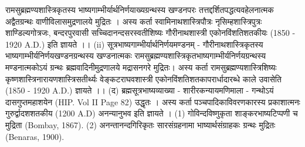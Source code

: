 रामसुब्रह्मण्यशास्त्रिकृतस्य भाष्यगाम्भीर्यार्थनिर्णयाख्यग्रन्थस्य खण्डनपरः तत्तद्दर्शितपद्धत्यवहेलनात्मक अद्वैतग्रन्थः वाणीविलासमुद्रणालये मुद्रितः । अस्य कर्ता स्वामिनाथशास्त्रिपौत्रः नृसिम्हशास्त्रिपुत्रः शाण्डिल्यगोत्रजः, बन्दरपुरवासी सच्चिदानन्दसरस्वतीशिष्यः गौरीनाथशास्त्री एकोनविंशतिशतकीयः (1850 - 1920 A.D.) इति ज्ञायते ।।
(ii) सूत्रभाष्यगाम्भीर्यार्थनिर्णयमण्डनम् - 
गौरीनाथशास्त्रिकृतस्य भाष्यगाम्भीर्यनिर्णयखण्डनग्रन्थस्य खण्डनात्मकः रामसुब्रह्मण्यशास्त्रिकृतभाष्यगाम्भीर्यनिर्णयग्रन्थस्य मण्डनात्मकोऽयं ग्रन्थः ब्रह्मवादिनीमुद्रणालये मद्रासनगरे मुद्रितः। अस्य कर्ता रामसुब्रह्मण्यशास्त्रिशिष्यः कृष्णशास्त्रिनारायणशास्त्रिसतीर्थ्यः वेङ्कटराघवशास्त्री एकोनविंशतिशतकापरार्धादारब्धे काले उवासेति (1850 - 1920 A.D.) ज्ञायते ।। 
(द) ब्रह्मसूत्रभाष्यव्याख्या - शारीरकन्यायमणिमाला - 
गन्थोऽयं दासगुप्तमहाशयेन (HIP. Vol II Page 82) उद्धृतः । अस्य कर्ता पञ्चपादिकाविवरणकारस्य प्रकाशात्मनः गुरुर्द्वादशशतकीय (1200 A.D)  अनन्यानुभव इति ज्ञायते । (1) गोविन्दविष्णुकृता शाङ्करभाष्यटिप्पणी च मुद्रिता (Bombay, 1867). (2) अनन्तानन्दगिरिकृतः सारसंग्रहनामा भाष्यार्थसंग्राहकः ग्रन्थः मुद्रितः (Benaras, 1900). 

 
